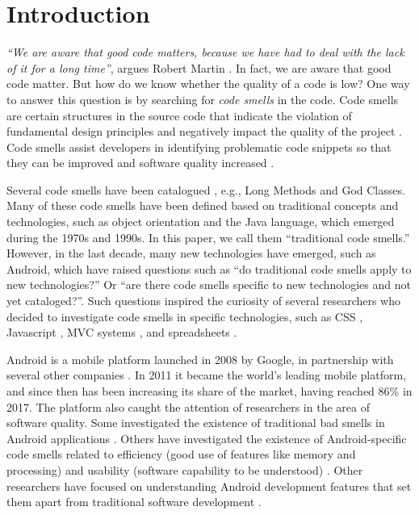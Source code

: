 
\section{Introduction}

\emph{``We are aware that good code matters, because we have had to deal with the lack of it for a long time''}, argues Robert Martin \cite{CleanCode:08}. In fact, we are aware that good code matter. But how do we know whether the quality of a code is low? One way to answer this question is by searching for \emph{code smells} in the code. Code smells are certain structures in the source code that indicate the violation of fundamental design principles and negatively impact the quality of the project \cite{Refactoring:14}. Code smells assist developers in identifying problematic code snippets so that they can be improved and software quality increased \cite{Refactoring:99}.


Several code smells have been catalogued \cite{Refactoring:99,CleanCode:08,Refactoring:14,Webster:95}, e.g., Long Methods and God Classes. Many of these code smells have been defined based on traditional concepts and technologies, such as object orientation and the Java language, which emerged during the 1970s and 1990s. In this paper, we call them ``traditional code smells.'' However, in the last decade, many new technologies have emerged, such as Android, which have raised questions such as ``do traditional code smells apply to new technologies?'' Or ``are there code smells specific to new technologies and not yet cataloged?''. Such questions inspired the curiosity of several researchers who decided to investigate code smells in specific technologies, such as CSS \cite{CSSCodeSmell}, Javascript \cite{JavascriptSmells}, MVC systems \cite{AnicheSmellsMVC:17,MvcSmells:16}, and spreadsheets \cite{SpreadsheetsSmells:12}.

Android is a mobile platform launched in 2008 by Google, in partnership with several other companies \cite{OHAReleasesAndroidSDK:07}. In 2011 it became the world's leading mobile platform, and since then has been increasing its share of the market, having reached 86\% \cite{GlobalSmartphoneSales:09-17} in 2017.
The platform also caught the attention of researchers in the area of software quality. Some investigated the existence of traditional bad smells in Android applications \cite{Hecht:15,DomainMatters,MobileSmells:13}. Others have investigated the existence of Android-specific code smells related to efficiency (good use of features like memory and processing) and usability (software capability to be understood) \cite{RemovingEnergySmells:12, 30QualitySmells:14}. Other researchers have focused on understanding Android development features that set them apart from traditional software development \cite{Mantyla2013}.



